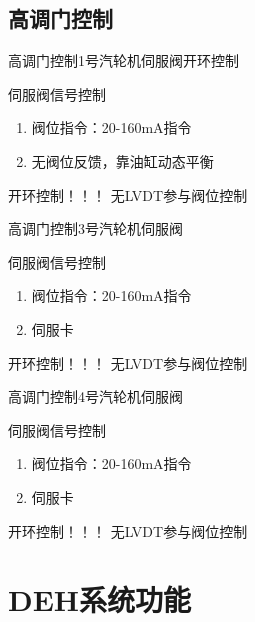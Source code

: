 \documentclass[12pt,hyperref={CJKbookmarks=true}]{beamer} %
\begin{document}
\subsection{高调门控制}
\begin{frame}{高调门控制}{1号汽轮机伺服阀开环控制}
\begin{block}{伺服阀信号控制}
			\begin{enumerate}
				\item 阀位指令：20-160mA指令
				\item  无阀位反馈，靠油缸动态平衡
			\end{enumerate}
		\end{block}
\pause
\begin{alertblock}{\heiti 开环控制！！！}
			无LVDT参与阀位控制 
		\end{alertblock}
\end{frame}
\begin{frame}{高调门控制}{3号汽轮机伺服阀}
\begin{block}{伺服阀信号控制}
			\begin{enumerate}
				\item 阀位指令：20-160mA指令
				\item  伺服卡
			\end{enumerate}
		\end{block}
\pause
\begin{alertblock}{\heiti 开环控制！！！}
			无LVDT参与阀位控制 
		\end{alertblock}
\end{frame}
\begin{frame}{高调门控制}{4号汽轮机伺服阀}
\begin{block}{伺服阀信号控制}
			\begin{enumerate}
				\item 阀位指令：20-160mA指令
				\item  伺服卡
			\end{enumerate}
		\end{block}
\pause
\begin{alertblock}{\heiti 开环控制！！！}
			无LVDT参与阀位控制 
		\end{alertblock}
\end{frame}
\section{DEH系统功能}
\end{document}
